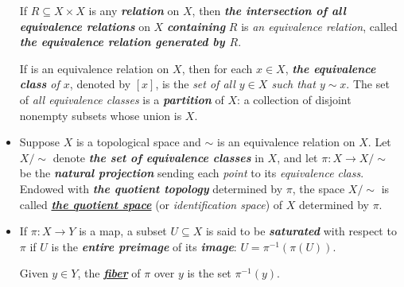 \documentclass[11pt]{article}
\begin{document}
\begin{itemize}
\begin{definition}
If $R \subseteq X \times X$ is any \emph{\textbf{relation}} on $X$, then \emph{\textbf{the intersection of all equivalence
relations}} on $X$ \emph{\textbf{containing}} $R$ is \emph{an equivalence relation}, called \emph{\textbf{the equivalence relation generated by $R$}}. 
\end{definition}

\begin{remark}
If is an equivalence relation on $X$, then for each $x\in X$, \emph{\textbf{the equivalence class} of $x$}, denoted by $[x]$, is the \emph{set of all $y \in X$ such that $y\sim x$}. The set of \emph{all equivalence classes} is a \emph{\textbf{partition}} of $X$: a collection of disjoint nonempty subsets whose union is $X$.
\end{remark}

\item \begin{definition}
Suppose $X$ is a topological space and $\sim$ is an equivalence relation on $X$. Let $X/\sim$ denote \emph{\textbf{the set of equivalence classes}} in $X$, and let $\pi: X \rightarrow X/\sim$ be the \emph{\textbf{natural projection}} sending each \emph{point} to its \emph{equivalence class}. Endowed with \emph{\textbf{the quotient topology}} determined by $\pi$, the space $X/\sim$ is called \underline{\emph{\textbf{the quotient space}}} (or \emph{identification space}) of $X$ determined by $\pi$.
\end{definition}

\item \begin{definition}
If $\pi: X \rightarrow Y$ is a map, a subset $U \subseteq X$ is said to be \emph{\textbf{saturated}} with respect to $\pi$ if $U$ is the \textbf{\emph{entire preimage}} of its \emph{\textbf{image}}: $U =\pi^{-1}(\pi(U))$. 

Given $y \in Y$, the \underline{\emph{\textbf{fiber}}} of $\pi$ over $y$ is the set $\pi^{-1}(y)$. 
\end{definition}
\end{itemize}
\end{document}
